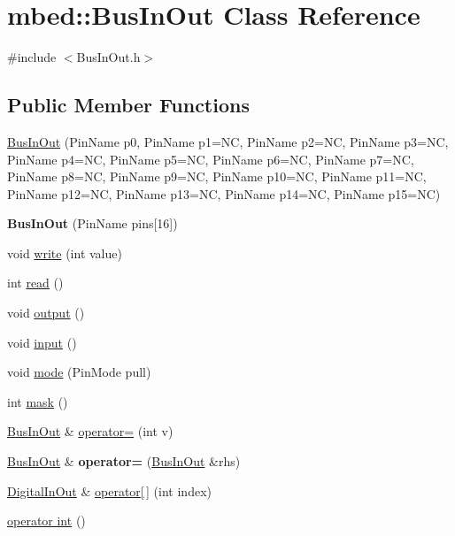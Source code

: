 \hypertarget{classmbed_1_1BusInOut}{}\section{mbed\+:\+:Bus\+In\+Out Class Reference}
\label{classmbed_1_1BusInOut}


{\ttfamily \#include $<$Bus\+In\+Out.\+h$>$}

\subsection*{Public Member Functions}
\begin{DoxyCompactItemize}
\item 
\hyperlink{classmbed_1_1BusInOut_aeb307d492d797e5a10919a92f1da5e31}{Bus\+In\+Out} (Pin\+Name p0, Pin\+Name p1=NC, Pin\+Name p2=NC, Pin\+Name p3=NC, Pin\+Name p4=NC, Pin\+Name p5=NC, Pin\+Name p6=NC, Pin\+Name p7=NC, Pin\+Name p8=NC, Pin\+Name p9=NC, Pin\+Name p10=NC, Pin\+Name p11=NC, Pin\+Name p12=NC, Pin\+Name p13=NC, Pin\+Name p14=NC, Pin\+Name p15=NC)
\item 
{\bfseries Bus\+In\+Out} (Pin\+Name pins\mbox{[}16\mbox{]})\hypertarget{classmbed_1_1BusInOut_ad8e4b46a0066126a575c054e22aa4b42}{}\label{classmbed_1_1BusInOut_ad8e4b46a0066126a575c054e22aa4b42}

\item 
void \hyperlink{classmbed_1_1BusInOut_a36473cded1109d3960d51c6f8e1ee123}{write} (int value)
\item 
int \hyperlink{classmbed_1_1BusInOut_a98154c0add9d2e8bec0e27ca42249b31}{read} ()
\item 
void \hyperlink{classmbed_1_1BusInOut_aea68cf05f895ef5d7a6c4a963fe695d4}{output} ()
\item 
void \hyperlink{classmbed_1_1BusInOut_a2f5cdeb39d9f1b2e71281f48ead9090f}{input} ()
\item 
void \hyperlink{classmbed_1_1BusInOut_ae16e26bbb20523c2ae428db3fca5bb15}{mode} (Pin\+Mode pull)
\item 
int \hyperlink{classmbed_1_1BusInOut_a45354e1e41ecf96b5fb5377ea4fcad72}{mask} ()
\item 
\hyperlink{classmbed_1_1BusInOut}{Bus\+In\+Out} \& \hyperlink{classmbed_1_1BusInOut_a06873b99a95de7450adf676539bf3f54}{operator=} (int v)
\item 
\hyperlink{classmbed_1_1BusInOut}{Bus\+In\+Out} \& {\bfseries operator=} (\hyperlink{classmbed_1_1BusInOut}{Bus\+In\+Out} \&rhs)\hypertarget{classmbed_1_1BusInOut_adc7c23db4da5248ec4276deea09f05a2}{}\label{classmbed_1_1BusInOut_adc7c23db4da5248ec4276deea09f05a2}

\item 
\hyperlink{classmbed_1_1DigitalInOut}{Digital\+In\+Out} \& \hyperlink{classmbed_1_1BusInOut_aa0dd624a54ddbf5155537b73cc9bc962}{operator\mbox{[}$\,$\mbox{]}} (int index)
\item 
\hyperlink{classmbed_1_1BusInOut_a63844c4d74e7de4818fa07447c2ba7c2}{operator int} ()
\end{DoxyCompactItemize}
